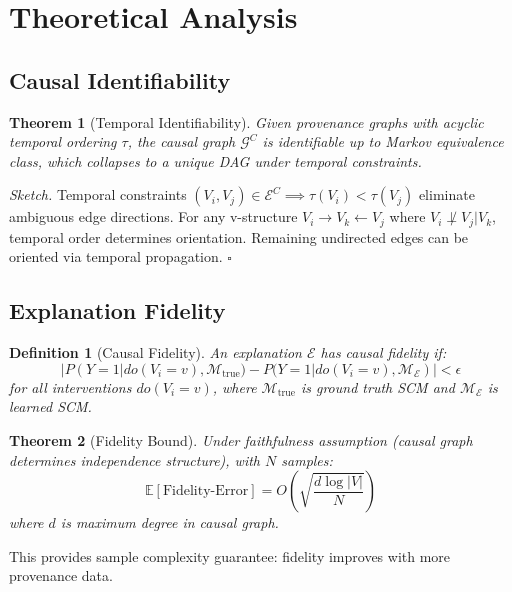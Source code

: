 \documentclass[conference]{IEEEtran}
\newtheorem{theorem}{Theorem}
\newtheorem{definition}{Definition}
\begin{document}
\section{Theoretical Analysis}\label{sec:theory}

\subsection{Causal Identifiability}

\begin{theorem}[Temporal Identifiability]
Given provenance graphs with acyclic temporal ordering $\tau$, the causal graph $\mathcal{G}^C$ is identifiable up to Markov equivalence class, which collapses to a unique DAG under temporal constraints.
\end{theorem}

\textit{Sketch.} Temporal constraints $(V_i, V_j) \in \mathcal{E}^C \implies \tau(V_i) < \tau(V_j)$ eliminate ambiguous edge directions. For any v-structure $V_i \rightarrow V_k \leftarrow V_j$ where $V_i \not\perp V_j | V_k$, temporal order determines orientation. Remaining undirected edges can be oriented via temporal propagation. $\square$

\subsection{Explanation Fidelity}

\begin{definition}[Causal Fidelity]
An explanation $\mathcal{E}$ has causal fidelity if:
\begin{equation}
|P(Y=1|do(V_i=v), \mathcal{M}_{\text{true}}) - P(Y=1|do(V_i=v), \mathcal{M}_{\mathcal{E}})| < \epsilon
\end{equation}
for all interventions $do(V_i=v)$, where $\mathcal{M}_{\text{true}}$ is ground truth SCM and $\mathcal{M}_{\mathcal{E}}$ is learned SCM.
\end{definition}

\begin{theorem}[Fidelity Bound]
Under faithfulness assumption (causal graph determines independence structure), with $N$ samples:
\begin{equation}
\mathbb{E}[\text{Fidelity-Error}] = O\left(\sqrt{\frac{d \log |V|}{N}}\right)
\end{equation}
where $d$ is maximum degree in causal graph.
\end{theorem}

This provides sample complexity guarantee: fidelity improves with more provenance data.
\end{document}
